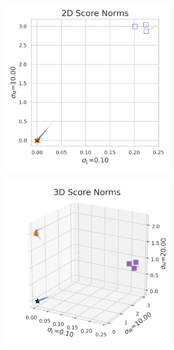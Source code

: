 \begin{figure}[tbhp]

\centering
\begin{subfigure}[b]{0.45\textwidth}
    \centering
    \includegraphics[scale=0.3]{figures/scatter_2d_white.png}
    \label{fig:score_norms_2d}
\end{subfigure}
\begin{subfigure}[b]{0.45\textwidth}
    \centering
    \includegraphics[scale=0.3]{figures/scatter_3d_white.png}

\end{subfigure}
\end{figure}
